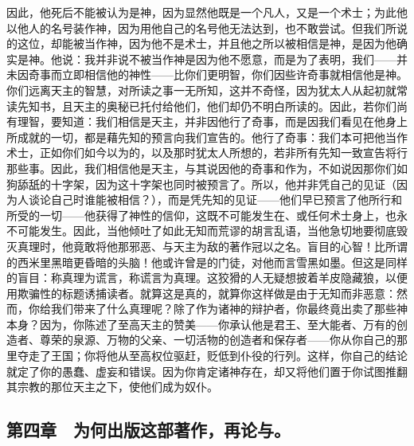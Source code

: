 因此，他死后不能被认为是神，因为显然他既是一个凡人，又是一个术士；为此他以他人的名号装作神，因为用他自己的名号他无法达到，也不敢尝试。但我们所说的这位，却能被当作神，因为他不是术士，并且他之所以被相信是神，是因为他确实是神。他说：我并非说不被当作神是因为他不愿意，而是为了表明，我们——并未因奇事而立即相信他的神性——比你们更明智，你们因些许奇事就相信他是神。你们远离天主的智慧，对所读之事一无所知，这并不奇怪，因为犹太人从起初就常读先知书，且天主的奥秘已托付给他们，他们却仍不明白所读的。因此，若你们尚有理智，要知道：我们相信是天主，并非因他行了奇事，而是因我们看见在他身上所成就的一切，都是藉先知的预言向我们宣告的。他行了奇事：我们本可把他当作术士，正如你们如今以为的，以及那时犹太人所想的，若非所有先知一致宣告将行那些事。因此，我们相信他是天主，与其说因他的奇事和作为，不如说因那你们如狗舔舐的十字架，因为这十字架也同时被预言了。所以，他并非凭自己的见证（因为人谈论自己时谁能被相信？），而是凭先知的见证——他们早已预言了他所行和所受的一切——他获得了神性的信仰，这既不可能发生在、或任何术士身上，也永不可能发生。因此，当他倾吐了如此无知而荒谬的胡言乱语，当他急切地要彻底毁灭真理时，他竟敢将他那邪恶、与天主为敌的著作冠以之名。盲目的心智！比所谓的西米里黑暗更昏暗的头脑！他或许曾是的门徒，对他而言雪黑如墨。但这是同样的盲目：称真理为谎言，称谎言为真理。这狡猾的人无疑想披着羊皮隐藏狼，以便用欺骗性的标题诱捕读者。就算这是真的，就算你这样做是由于无知而非恶意：然而，你给我们带来了什么真理呢？除了作为诸神的辩护者，你最终竟出卖了那些神本身？因为，你陈述了至高天主的赞美——你承认他是君王、至大能者、万有的创造者、尊荣的泉源、万物的父亲、一切活物的创造者和保存者——你从你自己的那里夺走了王国；你将他从至高权位驱赶，贬低到仆役的行列。这样，你自己的结论就定了你的愚蠢、虚妄和错误。因为你肯定诸神存在，却又将他们置于你试图推翻其宗教的那位天主之下，使他们成为奴仆。\par


\subsection{第四章　为何出版这部著作，再论与。}

